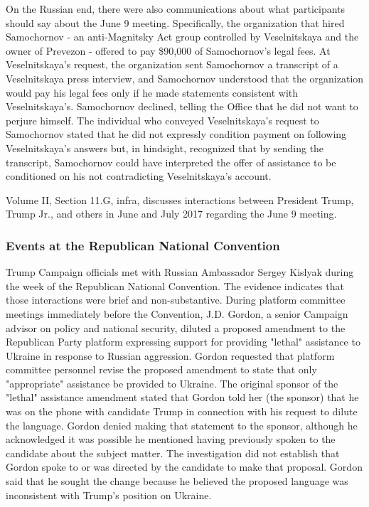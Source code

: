 On the Russian end, there were also communications about what participants should say about the June 9 meeting.
Specifically, the organization that hired Samochornov - an anti-Magnitsky Act group controlled by Veselnitskaya and the owner of Prevezon - offered to pay \$90,000 of Samochornov's legal fees.%
At Veselnitskaya's request, the organization sent Samochornov a transcript of a Veselnitskaya press interview, and Samochornov understood that the organization would pay his legal fees only if he made statements consistent with Veselnitskaya's.%
Samochornov declined, telling the Office that he did not want to perjure himself.%
The individual who conveyed Veselnitskaya's request to Samochornov stated that he did not expressly condition payment on following Veselnitskaya's answers but, in hindsight, recognized that by sending the transcript, Samochornov could have interpreted the offer of assistance to be conditioned on his not contradicting Veselnitskaya's account.%

Volume II, Section 11.G, infra, discusses interactions between President Trump, Trump Jr., and others in June and July 2017 regarding the June 9 meeting.

\subsubsection{Events at the Republican National Convention}

Trump Campaign officials met with Russian Ambassador Sergey Kislyak during the week of the Republican National Convention.
The evidence indicates that those interactions were brief and non-substantive.
During platform committee meetings immediately before the Convention, J.D. Gordon, a senior Campaign advisor on policy and national security, diluted a proposed amendment to the Republican Party platform expressing support for providing "lethal" assistance to Ukraine in response to Russian aggression.
Gordon requested that platform committee personnel revise the proposed amendment to state that only "appropriate" assistance be provided to Ukraine.
The original sponsor of the "lethal" assistance amendment stated that Gordon told her (the sponsor) that he was on the phone with candidate Trump in connection with his request to dilute the language.
Gordon denied making that statement to the sponsor, although he acknowledged it was possible he mentioned having previously spoken to the candidate about the subject matter.
The investigation did not establish that Gordon spoke to or was directed by the candidate to make that proposal.
Gordon said that he sought the change because he believed the proposed language was inconsistent with Trump's position on Ukraine.

